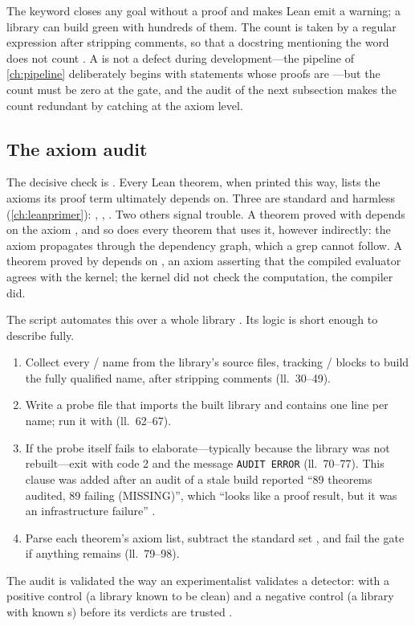 The keyword  closes any goal without a proof and makes
Lean emit a warning; a library can build green with hundreds of them. The count is taken by
a regular expression after stripping comments, so that a docstring mentioning the word does
not count . A  is not a defect during
development---the pipeline of \cref{ch:pipeline} deliberately begins with statements whose
proofs are ---but the count must be zero at the gate, and the audit of the next
subsection makes the count redundant by catching  at the axiom level.

\subsection{The axiom audit}\label{sec:architecture:axioms}

The decisive check is . Every Lean theorem, when printed this way,
lists the axioms its proof term ultimately depends on. Three are standard and harmless
(\cref{ch:leanprimer}): , , . Two
others signal trouble. A theorem proved with  depends on the axiom
, and so does every theorem that uses it, however indirectly: the axiom
propagates through the dependency graph, which a  grep cannot follow. A theorem
proved by  depends on , an axiom asserting that
the compiled evaluator agrees with the kernel; the kernel did not check the computation, the
compiler did.

The script  automates this over a whole library
. Its logic is short enough to describe fully.
\begin{enumerate}[leftmargin=*,itemsep=1pt]
\item Collect every / name from the library's source files,
  tracking / blocks to build the fully qualified name, after
  stripping comments (ll.~30--49).
\item Write a probe file that imports the built library and contains one
   line per name; run it with  (ll.~62--67).
\item If the probe itself fails to elaborate---typically because the library was not
  rebuilt---exit with code 2 and the message \texttt{AUDIT ERROR} (ll.~70--77). This clause
  was added after an audit of a stale build reported ``89 theorems audited, 89 failing
  (MISSING)'', which ``looks like a proof result, but it was an infrastructure failure''
  .
\item Parse each theorem's axiom list, subtract the standard set
  , and fail the gate if anything remains
  (ll.~79--98).
\end{enumerate}
The audit is validated the way an experimentalist validates a detector: with a positive
control (a library known to be clean) and a negative control (a library with known
s) before its verdicts are trusted .

